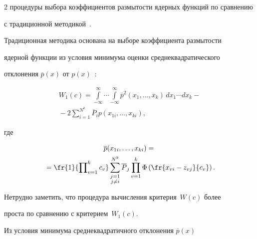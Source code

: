 \begin{multicols}{2}
процедуры выбора коэффициентов размытости ядерных функций по сравнению 


с традиционной методикой~\cite{10-l}.


  


  Традиционная методика основана на выборе коэффициента размытости 


ядерной функции из условия минимума оценки среднеквадратического 


отклонения $\overline{p}(x)$ от $p(x)$~\cite{10-l}:





\pagebreak





\noindent


\begin{multline*}


  W_1(c)=\int\limits_{-\infty}^\infty\! \cdots\! \int\limits_{-\infty}^\infty 


\overline{p}^2(x_1,\ldots , x_k)\,dx_1\cdots  dx_k -{}\\


{}-2\sum\limits^{N^k}_{i=1} 


\overline{P}_i p ( x_{1i},\ldots , x_{ki}),


  \end{multline*}


где


\begin{multline*}


\overline{p} (x_{1i},\ldots , x_{ki})={}\\  


{}= \fr{1}{\prod\nolimits_{v=1}^k c_v} \sum\limits^{N^k}_{\substack{{j=1}\\ {j\not=i}}}


\overline{P}_j \prod\limits^k_{v=1} \Phi \left( \fr{x_{vi}- z_{vj}}{c_v}\right).


\end{multline*}


  


  Нетрудно заметить, что процедура вычисления критерия~$W(c)$ более 


проста по сравнению с критерием~$W_1(c)$.


  


  Из условия минимума среднеквадратичного отклонения $\overline{p}(x)$ 



\end{multicols}
